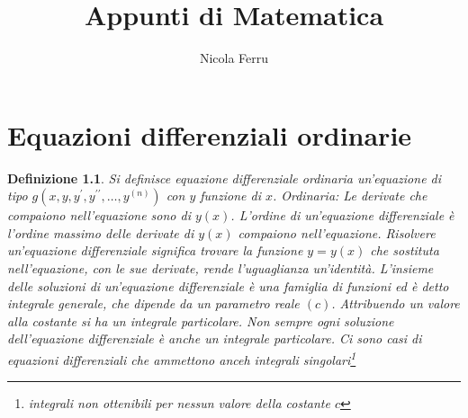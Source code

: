 \documentclass{book}
\title{Appunti di Matematica}
\author{Nicola Ferru}
\date{}
\newtheorem{defi}{Definizione}
\begin{document}


\tableofcontents
\listoffigures








\chapter{Equazioni differenziali ordinarie}
\begin{defi}
  Si definisce equazione differenziale ordinaria un'equazione di tipo $g(x,y,y^\prime,
  y^{\prime\prime},\dots,y^{(n)})$ con $y$ funzione di $x$. {\color{red}Ordinaria:} Le
  derivate che compaiono nell'equazione sono di $y(x)$. L'ordine di un'equazione
  differenziale è l'ordine massimo delle derivate di $y(x)$ compaiono nell'equazione.
  Risolvere un'equazione differenziale significa trovare la funzione $y=y(x)$ che
  sostituta nell'equazione, con le sue derivate, rende l'uguaglianza un'identità.
  L'insieme delle soluzioni di un'equazione differenziale è una famiglia di funzioni ed è
  detto {\color{red}integrale generale}, che dipende da un parametro reale $(c)$.
  Attribuendo un valore alla costante si ha un {\color{red}integrale particolare}. Non
  sempre ogni soluzione dell'equazione differenziale è anche un integrale particolare.
  Ci sono casi di equazioni differenziali che ammettono anceh integrali singolari\footnote{integrali non ottenibili per nessun valore della costante $c$}
\end{defi}
\end{document}
